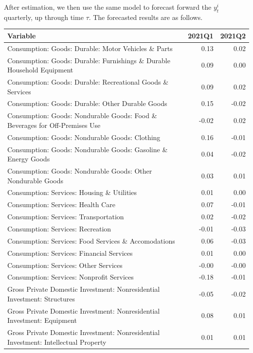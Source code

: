 \documentclass[11pt, letterpaper]{article}\usepackage[]{graphicx}\usepackage[]{color}
\begin{document}
After estimation, we then use the same model to forecast forward the $y^i_t$ quarterly, up through time $\tau$. 
The forecasted results are as follows.
\begin{table}[H]
\centering
\begingroup\scriptsize
\begin{tabular}{lrr}
  \hline
Variable & 2021Q1 & 2021Q2 \\ 
  \hline
Consumption: Goods: Durable: Motor Vehicles \& Parts & 0.13 & 0.02 \\ 
  Consumption: Goods: Durable: Furnishings \& Durable Household Equipment & 0.09 & 0.00 \\ 
  Consumption: Goods: Durable: Recreational Goods \& Services & 0.09 & 0.02 \\ 
  Consumption: Goods: Durable: Other Durable Goods & 0.15 & -0.02 \\ 
  Consumption: Goods: Nondurable Goods: Food \& Beverages for Off-Premises Use & -0.02 & 0.02 \\ 
  Consumption: Goods: Nondurable Goods: Clothing & 0.16 & -0.01 \\ 
  Consumption: Goods: Nondurable Goods: Gasoline \& Energy Goods & 0.04 & -0.02 \\ 
  Consumption: Goods: Nondurable Goods: Other Nondurable Goods & 0.03 & 0.01 \\ 
  Consumption: Services: Housing \& Utilities & 0.01 & 0.00 \\ 
  Consumption: Services: Health Care & 0.07 & -0.01 \\ 
  Consumption: Services: Transportation & 0.02 & -0.02 \\ 
  Consumption: Services: Recreation & -0.01 & -0.03 \\ 
  Consumption: Services: Food Services \& Accomodations & 0.06 & -0.03 \\ 
  Consumption: Services: Financial Services & 0.01 & 0.00 \\ 
  Consumption: Services: Other Services & -0.00 & -0.00 \\ 
  Consumption: Services: Nonprofit Services & -0.18 & -0.01 \\ 
  Gross Private Domestic Investment: Nonresidential Investment: Structures & -0.05 & -0.02 \\ 
  Gross Private Domestic Investment: Nonresidential Investment: Equipment & 0.08 & 0.01 \\ 
  Gross Private Domestic Investment: Nonresidential Investment: Intellectual Property & 0.01 & 0.01 \\ 

\end{tabular}
\end{table}
\end{document}
